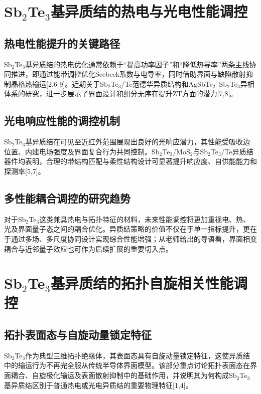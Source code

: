 \documentclass[12pt,a4paper]{ctexart}
\begin{document}
\section{\texorpdfstring{Sb$_2$Te$_3$}{Sb2Te3}基异质结的热电与光电性能调控}

\subsection{热电性能提升的关键路径}
Sb$_2$Te$_3$基异质结的热电优化通常依赖于“提高功率因子”和“降低热导率”两条主线协同推进，即通过能带调控优化Seebeck系数与电导率，同时借助界面与缺陷散射抑制晶格热输运[2,6-9]。近期关于Sb$_2$Te$_3$/Te范德华异质结构和AgSbTe$_2$--Sb$_2$Te$_3$异相体系的研究，进一步展示了界面设计和组分无序在提升ZT方面的潜力[7,8]。

\subsection{光电响应性能的调控机制}
Sb$_2$Te$_3$基异质结在可见至近红外范围展现出良好的光响应潜力，其性能受吸收边位置、内建电场强度及界面复合行为共同控制。Sb$_2$Te$_3$/MoS$_2$与Sb$_2$Te$_3$/Te异质结器件均表明，合理的带结构匹配与柔性结构设计可显著提升响应度、自供能能力和探测率[5,7]。

\subsection{多性能耦合调控的研究趋势}
对于Sb$_2$Te$_3$这类兼具热电与拓扑特征的材料，未来性能调控将更加重视电、热、光及界面量子态之间的耦合优化。异质结策略的价值不仅在于单一指标提升，更在于通过多场、多尺度协同设计实现综合性能增强；从老师给出的导语看，界面相变耦合与近邻量子效应也可作为后续扩展的重要切入点。

\section{\texorpdfstring{Sb$_2$Te$_3$}{Sb2Te3}基异质结的拓扑自旋相关性能调控}

\subsection{拓扑表面态与自旋动量锁定特征}
Sb$_2$Te$_3$作为典型三维拓扑绝缘体，其表面态具有自旋动量锁定特征，这使异质结中的输运行为不再完全服从传统半导体界面模型。该部分重点讨论拓扑表面态在界面耦合、自旋极化输运及表面散射抑制中的基础作用，并说明其为何构成Sb$_2$Te$_3$基异质结区别于普通热电或光电异质结的重要物理特征[1,4]。
\end{document}
